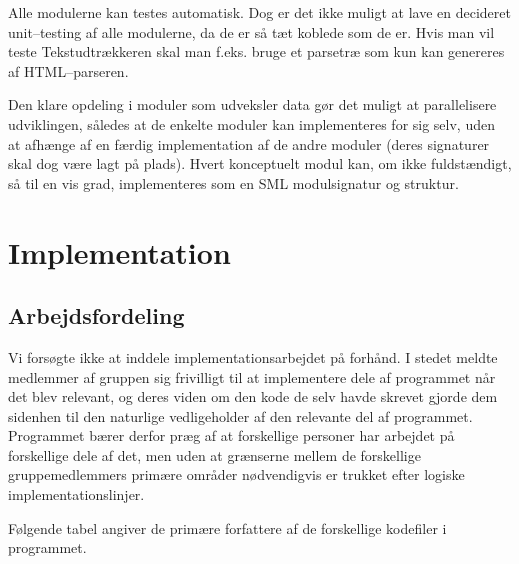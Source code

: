 \documentclass[a4paper,oneside]{memoir}
\begin{document}
Alle modulerne kan testes automatisk. Dog er det ikke muligt at lave
en decideret unit--testing af alle modulerne, da de er så tæt koblede
som de er. Hvis man vil teste Tekstudtrækkeren skal man f.eks. bruge
et parsetræ som kun kan genereres af HTML--parseren.

Den klare opdeling i moduler som udveksler data gør det muligt at
parallelisere udviklingen, således at de enkelte moduler kan
implementeres for sig selv, uden at afhænge af en færdig
implementation af de andre moduler (deres signaturer skal dog være
lagt på plads). Hvert konceptuelt modul kan, om ikke fuldstændigt, så
til en vis grad, implementeres som en SML modulsignatur og struktur.

\chapter{Implementation}
\label{implementation}

\section{Arbejdsfordeling}

Vi forsøgte ikke at inddele implementationsarbejdet på forhånd. I
stedet meldte medlemmer af gruppen sig frivilligt til at implementere
dele af programmet når det blev relevant, og deres viden om den kode
de selv havde skrevet gjorde dem sidenhen til den naturlige
vedligeholder af den relevante del af programmet. Programmet bærer
derfor præg af at forskellige personer har arbejdet på forskellige
dele af det, men uden at grænserne mellem de forskellige
gruppemedlemmers primære områder nødvendigvis er trukket efter logiske
implementationslinjer.

Følgende tabel angiver de primære forfattere af de forskellige
kodefiler i programmet.
\end{document}
